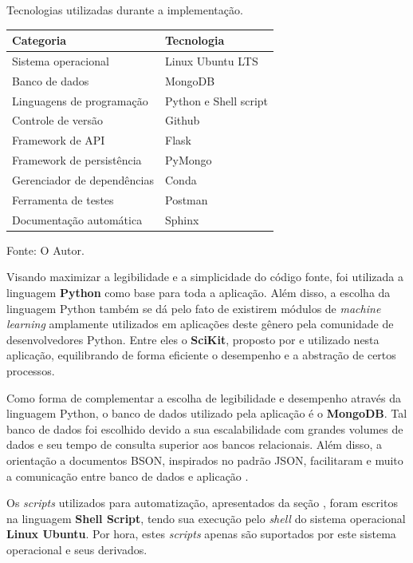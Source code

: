 \documentclass[12pt, openright, oneside, a4paper, brazil]{abntex2}
\begin{document}
\begin{quadro}[htp]

	\caption{\label{technologies}Tecnologias utilizadas durante a implementação.}
	\centering
	\begin{tabular}{|l|l|}
	\hline
	\textbf{Categoria} 			& \textbf{Tecnologia}   \\ \hline
	Sistema operacional 		& Linux Ubuntu LTS      \\ \hline
	Banco de dados 		   		& MongoDB  				\\ \hline
	Linguagens de programação   & Python e Shell script \\ \hline
	Controle de versão          & Github   				\\ \hline
	Framework de API        	& Flask      			\\ \hline
	Framework de persistência 	& PyMongo 				\\ \hline
	Gerenciador de dependências & Conda 				\\ \hline
	Ferramenta de testes		& Postman				\\ \hline
	Documentação automática		& Sphinx				\\ \hline
	\end{tabular}

	Fonte: O Autor.

\end{quadro}

Visando maximizar a legibilidade e a simplicidade do código fonte, foi utilizada a linguagem \textbf{Python} como base para toda a aplicação. Além disso, a escolha da linguagem Python também se dá pelo fato de existirem módulos de \textit{machine learning} amplamente utilizados em aplicações deste gênero pela comunidade de desenvolvedores Python. Entre eles o \textbf{SciKit}, proposto por  e utilizado nesta aplicação, equilibrando de forma eficiente o desempenho e a abstração de certos processos.

Como forma de complementar a escolha de legibilidade e desempenho através da linguagem Python, o banco de dados utilizado pela aplicação é o \textbf{MongoDB}. Tal banco de dados foi escolhido devido a sua escalabilidade com grandes volumes de dados e seu tempo de consulta superior aos bancos relacionais. Além disso, a orientação a documentos BSON, inspirados no padrão JSON, facilitaram e muito a comunicação entre banco de dados e aplicação \cite{chodorow2013mongodb}.

Os \textit{scripts} utilizados para automatização, apresentados da seção , foram escritos na linguagem \textbf{Shell Script}, tendo sua execução pelo \textit{shell} do sistema operacional \textbf{Linux Ubuntu}. Por hora, estes \textit{scripts} apenas são suportados por este sistema operacional e seus derivados.
\end{document}
